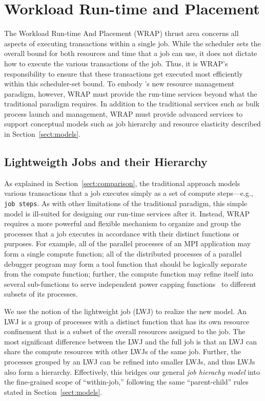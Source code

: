 \section{Workload Run-time and Placement} 
\label{sect:WRAP}

The Workload Run-time And Placement (WRAP) thrust area concerns all aspects of
executing transactions within a single job. 
While the scheduler sets the overall bound for both resources and time that a job 
can use, it does not dictate how to execute the various transactions of the job.
Thus, it is WRAP's responsibility to ensure that these transactions get executed 
most efficiently within this scheduler-set bound.
To embody \ngrm's new resource management paradigm, however, WRAP must provide the run-time
services beyond what the traditional paradigm requires. 
In addition to the traditional services such as bulk process launch and 
management, WRAP must provide advanced services to 
support conceptual models such as job hierarchy and resource elasticity 
described in Section~\ref{sect:models}.

\subsection{Lightweigth Jobs and their Hierarchy}

As explained in Section~\ref{sect:comparison}, the traditional
approach models various transactions that a job executes simply as a set of
compute steps---e.g., {\tt job steps}.
As with other limitations of the traditional paradigm, this simple model
is ill-suited for designing our run-time services after it. 
Instead, WRAP requires a more powerful and flexible mechanism
to organize and group the processes that a job executes 
in accordance with their distinct functions or purposes. 
For example, all of the parallel processes of an MPI application may form a single 
compute function; all of the distributed processes of a parallel
debugger program may form a tool function that should be logically separate from 
the compute function; further, the compute function
may refine itself into several sub-functions to serve
independent power capping functions~\cite{RountreeRAPL} to different subsets of its processes.  

We use the notion of the lightweight job (LWJ) to realize the new model. 
An LWJ is a group of processes with a distinct function 
that has its own resource confinement that is a subset of 
the overall resources assigned to the job.
The most significant difference between the LWJ and the full job is that an LWJ
can share the compute resources with other LWJs of the same job. 
Further, the processes grouped by an LWJ can be refined into smaller LWJs,
and thus LWJs also form a hierarchy. Effectively, this bridges 
our general {\em job hierachy model} into the fine-grained 
scope of ``within-job,'' following the same ``parent-child'' rules stated
in Section~\ref{sect:models}.


